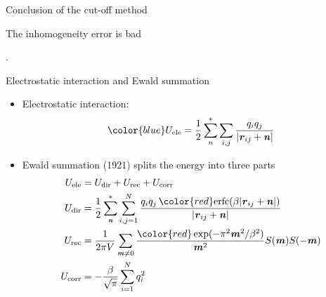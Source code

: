 \documentclass{beamer}
\newcommand{\redc}[1]{{\color{red} #1}}
\newcommand{\bluec}[1]{{\color{blue} #1}}
\renewcommand{\v}[1]{\textbf{\textit{#1}}}
\begin{document}
\begin{frame}{Conclusion of the cut-off method}
  \centerline{\redc{The inhomogeneity error is bad}}.
\end{frame}


\begin{frame}{Electrostatic interaction and Ewald summation}
  \begin{itemize}
  \item<1->   Electrostatic interaction:
  \begin{equation*}\bluec{
    U_{\textrm{ele}} = \frac12 \sum^\ast_{n}\sum_{i,j}\frac{q_i q_j}{\vert \v r_{ij} + \v n\vert}}
  \end{equation*}
\item <2->
  Ewald summation (1921) splits the
  energy into three parts
  \bluec{
  \begin {align*}
    U_{\textrm{ele}} &=  U_{\textrm{dir}} + U_{\textrm{rec}}+ U_{\textrm{corr}}\\
    U_{\textrm{dir}} & = \frac12 \sum^{\ast}_{\v n}
    \sum_{i,j = 1}^{N} \frac{q_iq_j\, \redc{\textrm{erfc}(\beta \vert\v{r}_{ij} + \v{n}\vert)}}
    {\vert\v{r}_{ij} + \v{n}\vert} \\ \label{Erec-ewald}
    U_{\textrm{rec}} & = \frac1{2\pi V} \sum_{\v m \neq 0}
    \frac{\redc{\exp(-\pi^2\v m^2 / \beta^2)}}{\v m^2} S(\v m) S(-\v m) \\
    U_{\textrm{corr}}& = -\frac\beta{\sqrt \pi} \sum_{i=1}^N q_i^2
  \end {align*}}
  \end{itemize}
\end{frame}
\end{document}
